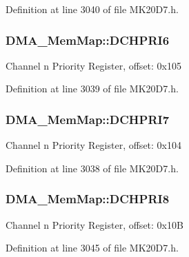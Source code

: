 Definition at line 3040 of file M\+K20\+D7.\+h.

\subsubsection[{\texorpdfstring{D\+C\+H\+P\+R\+I6}{DCHPRI6}}]{ D\+M\+A\+\_\+\+Mem\+Map\+::\+D\+C\+H\+P\+R\+I6}\hypertarget{struct_d_m_a___mem_map_afae44bbca4dbe8fa13517fbc57aaf8c1}{}\label{struct_d_m_a___mem_map_afae44bbca4dbe8fa13517fbc57aaf8c1}
Channel n Priority Register, offset\+: 0x105 

Definition at line 3039 of file M\+K20\+D7.\+h.

\subsubsection[{\texorpdfstring{D\+C\+H\+P\+R\+I7}{DCHPRI7}}]{ D\+M\+A\+\_\+\+Mem\+Map\+::\+D\+C\+H\+P\+R\+I7}\hypertarget{struct_d_m_a___mem_map_a8d4c0aeaadfcd877cbaf9ad7adc7828e}{}\label{struct_d_m_a___mem_map_a8d4c0aeaadfcd877cbaf9ad7adc7828e}
Channel n Priority Register, offset\+: 0x104 

Definition at line 3038 of file M\+K20\+D7.\+h.

\subsubsection[{\texorpdfstring{D\+C\+H\+P\+R\+I8}{DCHPRI8}}]{ D\+M\+A\+\_\+\+Mem\+Map\+::\+D\+C\+H\+P\+R\+I8}\hypertarget{struct_d_m_a___mem_map_aaf35a15b1aeb54e1a1f6806283eef6c2}{}\label{struct_d_m_a___mem_map_aaf35a15b1aeb54e1a1f6806283eef6c2}
Channel n Priority Register, offset\+: 0x10B 

Definition at line 3045 of file M\+K20\+D7.\+h.

